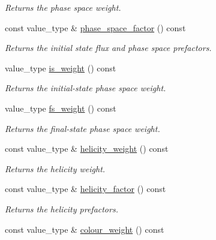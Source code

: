 \begin{DoxyCompactItemize}
\begin{DoxyCompactList}\small\item\em Returns the phase space weight. \end{DoxyCompactList}\item 
\hypertarget{a00430_a855d1f8106314b6956fdbf91e90b7d26}{const value\-\_\-type \& \hyperlink{a00430_a855d1f8106314b6956fdbf91e90b7d26}{phase\-\_\-space\-\_\-factor} () const }\label{a00430_a855d1f8106314b6956fdbf91e90b7d26}

\begin{DoxyCompactList}\small\item\em Returns the initial state flux and phase space prefactors. \end{DoxyCompactList}\item 
\hypertarget{a00430_acb573ed675785481c7aa8561a29f15bf}{value\-\_\-type \hyperlink{a00430_acb573ed675785481c7aa8561a29f15bf}{is\-\_\-weight} () const }\label{a00430_acb573ed675785481c7aa8561a29f15bf}

\begin{DoxyCompactList}\small\item\em Returns the initial-\/state phase space weight. \end{DoxyCompactList}\item 
\hypertarget{a00430_a0d59496a47e5def88b57407636c901b2}{value\-\_\-type \hyperlink{a00430_a0d59496a47e5def88b57407636c901b2}{fs\-\_\-weight} () const }\label{a00430_a0d59496a47e5def88b57407636c901b2}

\begin{DoxyCompactList}\small\item\em Returns the final-\/state phase space weight. \end{DoxyCompactList}\item 
\hypertarget{a00430_aca631af91752a7bdd6ead030c0b01c18}{const value\-\_\-type \& \hyperlink{a00430_aca631af91752a7bdd6ead030c0b01c18}{helicity\-\_\-weight} () const }\label{a00430_aca631af91752a7bdd6ead030c0b01c18}

\begin{DoxyCompactList}\small\item\em Returns the helicity weight. \end{DoxyCompactList}\item 
\hypertarget{a00430_a37f4d692d648bf3a752363d99693a070}{const value\-\_\-type \& \hyperlink{a00430_a37f4d692d648bf3a752363d99693a070}{helicity\-\_\-factor} () const }\label{a00430_a37f4d692d648bf3a752363d99693a070}

\begin{DoxyCompactList}\small\item\em Returns the helicity prefactors. \end{DoxyCompactList}\item 
\hypertarget{a00430_a183f62b32bdf1a26893679cf5a6e08e5}{const value\-\_\-type \& \hyperlink{a00430_a183f62b32bdf1a26893679cf5a6e08e5}{colour\-\_\-weight} () const }\label{a00430_a183f62b32bdf1a26893679cf5a6e08e5}


\end{DoxyCompactItemize}
